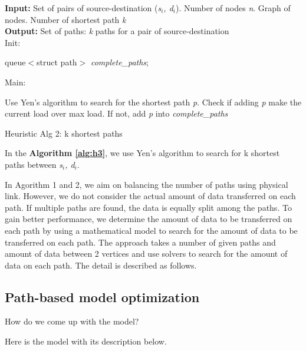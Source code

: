 \begin{algorithm}[!htp]
\textbf{Input:} Set of pairs of source-destination (\textit{s$_i$, d$_i$}). Number of nodes \textit{n}. Graph of nodes. Number of shortest path \textit{k}\\
\textbf{Output:} Set of paths: \textit{k} paths for a pair of source-destination\\
Init:
    \begin{algorithmic}
        \State queue$<$struct path$>$ \textit{complete\_paths};
    \end{algorithmic}
Main:
\begin{algorithmic}
		\State Use Yen's algorithm to search for the shortest path \textit{p}.
		\State Check if adding \textit{p} make the current load over max load.
		\State If not, add \textit{p} into \textit{complete\_paths}
	    \EndWhile
	\EndFor
    \EndFunction
\end{algorithmic}

\caption{Heuristic Alg 2: k shortest paths}
\label{alg:h2}

\end{algorithm}

In the \textbf{Algorithm \ref{alg:h3}}, we use Yen's algorithm to search for k shortest paths between \textit{s$_i$, d$_i$}.

In Agorithm 1 and 2, we aim on balancing the number of paths using physical link. However, we do not consider the actual amount of data transferred on each path. If multiple paths are found, the data is equally split among the paths. To gain better performance, we determine the amount of data to be transferred on each path by using a mathematical model to search for the amount of data to be transferred on each path. The approach takes a number of given paths and amount of data between 2 vertices and use solvers to search for the amount of data on each path. The detail is described as follows.

\subsection{Path-based model optimization}

How do we come up with the model?

Here is the model with its description below.

\begingroup
\fontsize{9pt}{9pt}\selectfont

